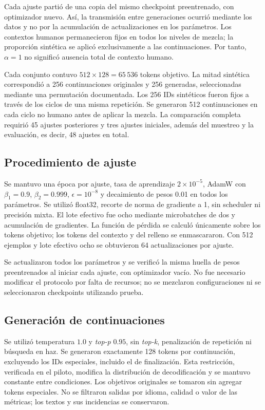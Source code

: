 \documentclass[12pt,letterpaper]{article}
\begin{document}
Cada ajuste partió de una copia del mismo checkpoint preentrenado, con
optimizador nuevo. Así, la transmisión entre generaciones ocurrió mediante
los datos y no por la acumulación de actualizaciones en los parámetros.
Los contextos humanos permanecieron fijos en todos los niveles de mezcla;
la proporción sintética se aplicó exclusivamente a las continuaciones.
Por tanto, \(\alpha=1\) no significó ausencia total de contexto humano.

Cada conjunto contuvo \(512\times128=65\,536\) tokens objetivo. La mitad
sintética correspondió a 256 continuaciones originales y 256 generadas,
seleccionadas mediante una permutación documentada. Los 256 IDs sintéticos
fueron fijos a través de los ciclos de una misma repetición. Se generaron
512 continuaciones en cada ciclo no humano antes de aplicar la mezcla.
La comparación completa
requirió 45 ajustes posteriores y tres ajustes iniciales, además del
muestreo y la evaluación, es decir, 48 ajustes en total.

\subsection{Procedimiento de ajuste}

Se mantuvo una época por ajuste, tasa de aprendizaje \(2\times10^{-5}\),
AdamW con \(\beta_1=0.9\), \(\beta_2=0.999\), \(\epsilon=10^{-8}\)
y decaimiento de pesos 0.01 en todos los parámetros. Se utilizó float32,
recorte de norma de gradiente a 1, sin scheduler ni precisión mixta. El lote
efectivo fue ocho mediante microbatches de dos y acumulación de gradientes.
La función de pérdida se calculó únicamente sobre los tokens objetivo;
los tokens del contexto y del relleno se enmascararon. Con 512 ejemplos y
lote efectivo ocho se obtuvieron 64 actualizaciones por ajuste.

Se actualizaron todos los parámetros y se verificó la misma huella de
pesos preentrenados al iniciar cada ajuste, con optimizador vacío. No fue necesario
modificar el protocolo por falta de recursos; no se mezclaron
configuraciones ni se seleccionaron checkpoints utilizando prueba.

\subsection{Generación de continuaciones}

Se utilizó temperatura \(1.0\) y \textit{top-p} \(0.95\), sin
\textit{top-k}, penalización de repetición ni búsqueda en haz. Se generaron
exactamente 128 tokens por continuación, excluyendo los IDs especiales,
incluido el de finalización. Esta restricción, verificada en el piloto,
modifica la distribución de decodificación y se mantuvo constante entre
condiciones. Los objetivos originales se tomaron sin agregar tokens
especiales. No se filtraron salidas por idioma, calidad o valor de las
métricas; los textos y sus incidencias se conservaron.
\end{document}
